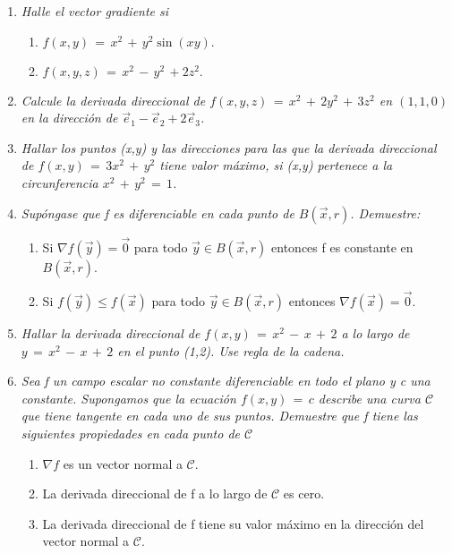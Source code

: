 \documentclass[12pt]{article}
\begin{document}
	\begin{enumerate}
		\item \textit{Halle  el vector gradiente si}
		
		\begin{enumerate}
		    \item $f(x,y) \, = \, x^{2} \, + \, y^{2} \sin(xy).$
		    \item $f(x,y,z) \, = \, x^{2} \, - \, y^{2} \, +2z^{2}.$
		\end{enumerate}
		
		\item \textit{Calcule la derivada direccional de $f(x,y,z) \, = \, x^{2} \, + \, 2y^{2} \, + \, 3z^{2}$ en $(1,1,0)$ en la dirección de $\vec{e}_{1} - \vec{e}_{2} + 2\vec{e}_{3}$.}
		
		\item \textit{Hallar los puntos (x,y) y las direcciones para las que la derivada direccional de $f(x,y) \, = \, 3x^{2} \, + \, y^{2}$ tiene valor máximo, si (x,y) pertenece a la circunferencia $x^{2} \, + \, y^{2} \, = \, 1$.}
		
		\item \textit{Supóngase que f es diferenciable en cada punto de $B(\vec{x}, r)$. Demuestre:}
		
		\begin{enumerate}
		    \item Si $\nabla f(\vec{y}) = \vec{0}$ para todo $\vec{y} \in B(\vec{x}, r)$ entonces f es constante en $B(\vec{x}, r)$.
		    \item Si $f(\vec{y}) \leqslant f(\vec{x})$ para todo $\vec{y} \in B(\vec{x}, r)$ entonces $\nabla f(\vec{x}) = \vec{0}.$
		\end{enumerate}
		
		\item \textit{Hallar la derivada direccional de $f(x,y) \, = \, x^{2} \, - \, x \, + \, 2$ a lo largo de $y \, = \, x^{2} \, - \, x \, + \, 2$ en el punto (1,2). Use regla de la cadena.}
		
		\item \textit{Sea f un campo escalar no constante diferenciable en todo el plano y c una constante. Supongamos que la ecuación $f(x,y) \, = \, c$ describe una curva $\mathscr{C}$ que tiene tangente en cada uno de sus puntos. Demuestre que f tiene las siguientes propiedades en cada punto de $\mathscr{C}$}
		
		\begin{enumerate}
		    \item $\nabla f$ es un vector normal a $\mathscr{C}$.
		    \item La derivada direccional de f a lo largo de $\mathscr{C}$ es cero.
		    \item La derivada direccional de f tiene su valor máximo en la dirección del vector normal a $\mathscr{C}$.
		\end{enumerate}
		

\end{enumerate}
\end{document}
